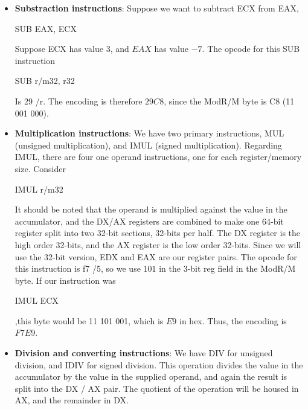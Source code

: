 \documentclass{report}
\begin{document}
\begin{itemize}
\begin{itemize}
                \item Either it selects a register operand
                \item Or it selects an opcode extension (/0–/7)
            \end{itemize}
        \item \textbf{Substraction instructions}: Suppose we want to subtract ECX from EAX,
            \bigbreak \noindent 
            \begin{cppcode}
            SUB    EAX, ECX
            \end{cppcode}
            \bigbreak \noindent 
            Suppose ECX has value 3, and $EAX$ has value $-7$. The opcode for this SUB instruction
            \bigbreak \noindent 
            \begin{cppcode}
             SUB r/m32, r32
            \end{cppcode}
            \bigbreak \noindent 
            Is 29 /r. The encoding is therefore $29C8$, since the ModR/M byte is C8 (11 001 000).
        \item \textbf{Multiplication instructions}: We have two primary instructions, MUL (unsigned multiplication), and IMUL (signed multiplication). Regarding IMUL, there are four one operand instructions, one for each register/memory size. Consider
            \bigbreak \noindent 
            \begin{cppcode}
            IMUL    r/m32
            \end{cppcode}
            \bigbreak \noindent 
            It should be noted that the operand is multiplied against the value in the accumulator, and the DX/AX registers are combined to make one 64-bit register split into two 32-bit sections, 32-bits per half. The DX register is the high order 32-bits, and the AX register is the low order 32-bits. Since we will use the 32-bit version, EDX and EAX are our register pairs.
            \bigbreak \noindent 
            The opcode for this instruction is f7 /5, so we use $101$ in the 3-bit reg field in the ModR/M byte. 
            \bigbreak \noindent 
            If our instruction was
            \bigbreak \noindent 
            \begin{cppcode}
            IMUL    ECX
            \end{cppcode}
            \bigbreak \noindent 
            ,this byte would be 11 101 001, which is $E9$ in hex. Thus, the encoding is $F7E9$.
        \item \textbf{Division and converting instructions}: We have DIV for unsigned division, and IDIV for signed division. This operation divides the value in the accumulator by the value in the supplied operand, and again the result is split into the DX / AX pair. The quotient of the operation will be housed in AX, and the remainder in DX.

\end{itemize}
\end{document}
